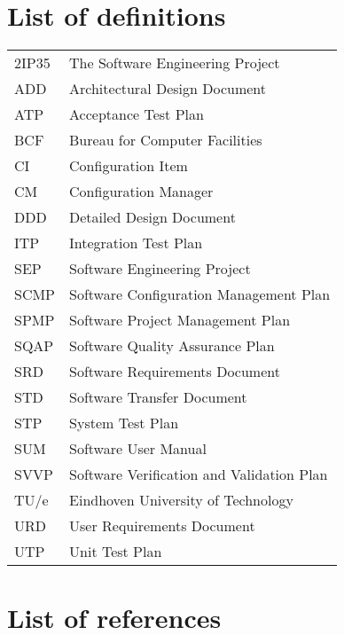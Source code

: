 \section{List of definitions}
\begin{tabular}{@{}ll@{}}
	\toprule
	2IP35 & The Software Engineering Project \\
	ADD   & Architectural Design Document \\
	ATP   & Acceptance Test Plan \\
	BCF   & Bureau for Computer Facilities \\
	CI    & Configuration Item \\
	CM    & Configuration Manager \\
	DDD   & Detailed Design Document \\
	ITP   & Integration Test Plan \\
	SEP   & Software Engineering Project \\
	SCMP  & Software Configuration Management Plan \\
	SPMP  & Software Project Management Plan \\
	SQAP  & Software Quality Assurance Plan \\
	SRD   & Software Requirements Document \\
	STD   & Software Transfer Document \\
	STP   & System Test Plan \\
	SUM   & Software User Manual \\
	SVVP  & Software Verification and Validation Plan \\
	TU/e  & Eindhoven University of Technology \\
	URD   & User Requirements Document \\
	UTP   & Unit Test Plan \\
	\bottomrule
\end{tabular}

\section{List of references}


